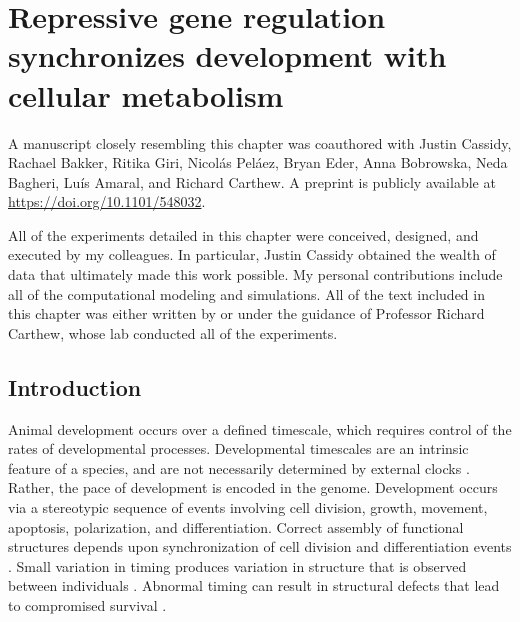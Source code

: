 
\graphicspath{ {figures/metabolism/} }


\chapter{Repressive gene regulation synchronizes development with cellular metabolism}
\label{ch:metabolism}

A manuscript closely resembling this chapter was coauthored with Justin Cassidy, Rachael Bakker, Ritika Giri, Nicol\'{a}s Pel\'{a}ez, Bryan Eder, Anna Bobrowska, Neda Bagheri, Lu\'{i}s Amaral, and Richard Carthew. A preprint is publicly available at \url{https://doi.org/10.1101/548032}. 

All of the experiments detailed in this chapter were conceived, designed, and executed by my colleagues. In particular, Justin Cassidy obtained the wealth of data that ultimately made this work possible. My personal contributions include all of the computational modeling and simulations. All of the text included in this chapter was either written by or under the guidance of Professor Richard Carthew, whose lab conducted all of the experiments.


\section{Introduction}

Animal development occurs over a defined timescale, which requires control of the rates of developmental processes. Developmental timescales are an intrinsic feature of a species, and are not necessarily determined by external clocks \cite{Ebisuya2018}. Rather, the pace of development is encoded in the genome. Development occurs via a stereotypic sequence of events involving cell division, growth, movement, apoptosis, polarization, and differentiation. Correct assembly of functional structures depends upon synchronization of cell division and differentiation events \cite{Foe1989,Sulston1983}. Small variation in timing produces variation in structure that is observed between individuals \cite{Francesconi2014,Poullet2016}. Abnormal timing can result in structural defects that lead to compromised survival \cite{Moss2007}.

